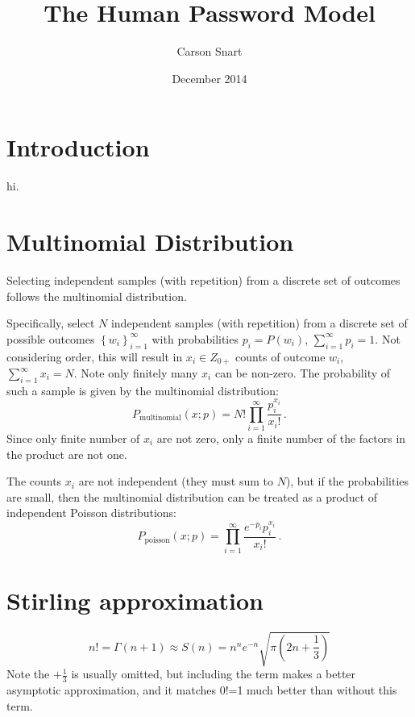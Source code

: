 \documentclass{article}
\title{The Human Password Model}
\author{Carson Snart}
\date{December 2014}
\begin{document}
\maketitle

\section{Introduction}
hi.
\section{Multinomial Distribution}
Selecting independent samples (with repetition) from a discrete set of outcomes follows the multinomial distribution.

Specifically, select $N$ independent samples (with repetition) from a discrete set of possible outcomes $\left\{w_i\right\}_{i=1}^{\infty}$ with probabilities $p_i=P(w_i)$,  $\sum_{i=1}^{\infty} p_i = 1$.  Not considering order, this will result in $x_i \in Z_{0+}$ counts of outcome $w_i$, $\sum_{i=1}^\infty x_i = N$.  Note only finitely many $x_i$ can be non-zero.
The probability of such a sample is given by the multinomial distribution:
\begin{equation}
\label{eq:multinomial}
P_{\text{multinomial}}(x;p)={N!}\prod_{i=1}^{\infty} \frac{p_i^{x_i}}{x_i!} \,. 
\end{equation}
Since only finite number of $x_i$ are not zero, only a finite number of the factors in the product are not one.

The counts $x_i$ are not independent (they must sum to $N$), but if the probabilities are small, then the multinomial distribution can be treated as a product of independent Poisson distributions:
\begin{equation}
P_{\text{poisson}}(x;p) = \prod_{i=1}^{\infty} \frac{e^{-p_i} p_i^{x_i}}{x_i!} \,.
\end{equation}

\section{Stirling approximation}
\begin{equation}
n!=\Gamma(n+1) \approx S(n) = n^n e^{-n} \sqrt{\pi \left(2n+\frac{1}{3}\right)}
\end{equation}
Note the $+\frac{1}{3}$ is usually omitted, but including the term makes a better asymptotic approximation, and it matches 0!=1 much better than without this term.
\end{document}
